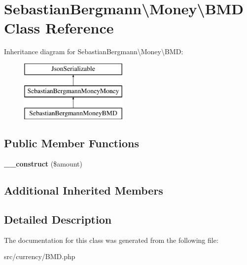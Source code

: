 \hypertarget{classSebastianBergmann_1_1Money_1_1BMD}{}\section{Sebastian\+Bergmann\textbackslash{}Money\textbackslash{}B\+M\+D Class Reference}
\label{classSebastianBergmann_1_1Money_1_1BMD}
Inheritance diagram for Sebastian\+Bergmann\textbackslash{}Money\textbackslash{}B\+M\+D\+:\begin{figure}[H]
\begin{center}
\leavevmode
\includegraphics[height=3.000000cm]{classSebastianBergmann_1_1Money_1_1BMD}
\end{center}
\end{figure}
\subsection*{Public Member Functions}
\begin{DoxyCompactItemize}
\item 
\hypertarget{classSebastianBergmann_1_1Money_1_1BMD_ae72c72ff988ac7ec4be959c0ec33797a}{}{\bfseries \+\_\+\+\_\+construct} (\$amount)\label{classSebastianBergmann_1_1Money_1_1BMD_ae72c72ff988ac7ec4be959c0ec33797a}

\end{DoxyCompactItemize}
\subsection*{Additional Inherited Members}


\subsection{Detailed Description}


The documentation for this class was generated from the following file\+:\begin{DoxyCompactItemize}
\item 
src/currency/B\+M\+D.\+php\end{DoxyCompactItemize}
